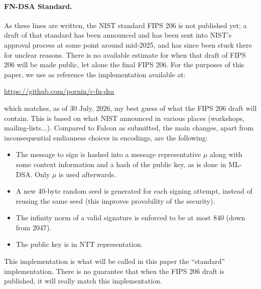 \documentclass{llncs}
\begin{document}
\paragraph{FN-DSA Standard.}
As these lines are written, the NIST standard FIPS 206 is not published
yet; a draft of that standard has been announced and has been sent into
NIST's approval process at some point around mid-2025, and has since
been stuck there for unclear reasons. There is no available estimate for
when that draft of FIPS 206 will be made public, let alone the final
FIPS 206. For the purposes of this paper, we use as reference the
implementation available at:
\begin{center}
    \url{https://github.com/pornin/c-fn-dsa}
\end{center}
which matches, as of 30 July, 2026, my best guess of what the FIPS 206
draft will contain. This is based on what NIST announced in various
places (workshops, mailing-lists...). Compared to Falcon as submitted,
the main changes, apart from inconsequential endianness choices in
encodings, are the following:
\begin{itemize}
    \item The message to sign is hashed into a message representative $\mu$
    along with some context information and a hash of the public key, as
    is done in ML-DSA\cite{Fips204}. Only $\mu$ is used afterwards.

    \item A new 40-byte random seed is generated for each signing attempt,
    instead of reusing the same seed (this improves provability of the
    security\cite{FouGajGroJanKil2026}).

    \item The infinity norm of a valid signature is enforced to be at
    most 840 (down from 2047).

    \item The public key is in NTT representation.
\end{itemize}
This implementation is what will be called in this paper the
``standard'' implementation. There is no guarantee that when the FIPS
206 draft is published, it will really match this implementation.
\end{document}
